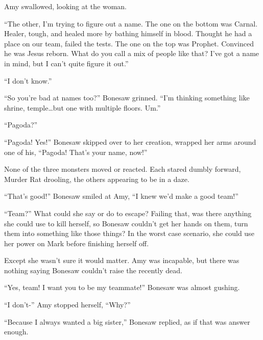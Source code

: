 Amy swallowed, looking at the woman.



``The other, I'm trying to figure out a name.  The one on the bottom was Carnal.  Healer, tough, and healed more by bathing himself in blood.  Thought he had a place on our team, failed the tests.  The one on the top was Prophet.  Convinced he was Jesus reborn.  What do you call a mix of people like that?  I've got a name in mind, but I can't quite figure it out.''



``I don't know.''



``So you're bad at names too?'' Bonesaw grinned.  ``I'm thinking something like shrine, temple\ldots but one with multiple floors.  Um.''



``Pagoda?''



``Pagoda!  Yes!''  Bonesaw skipped over to her creation, wrapped her arms around one of his, ``Pagoda!  That's your name, now!''



None of the three monsters moved or reacted.  Each stared dumbly forward, Murder Rat drooling, the others appearing to be in a daze.



``That's good!''  Bonesaw smiled at Amy, ``I knew we'd make a good team!''



``Team?''  What could she say or do to escape?  Failing that, was there anything she could use to kill herself, so Bonesaw couldn't get her hands on them, turn them into something like those things?  In the worst case scenario, she could use her power on Mark before finishing herself off.



Except she wasn't sure it would matter.  Amy was incapable, but there was nothing saying Bonesaw couldn't raise the recently dead.



``Yes, team!  I want you to be my teammate!''  Bonesaw was almost gushing.



``I don't-'' Amy stopped herself, ``Why?''



``Because I always wanted a big sister,'' Bonesaw replied, as if that was answer enough.



